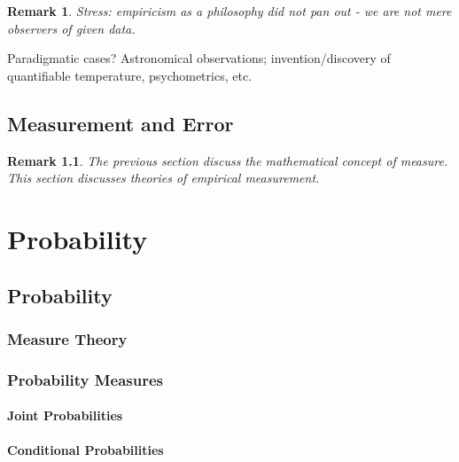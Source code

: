 \documentclass[reqno,12pt]{tufte-book}
\numberwithin{equation}{subsection}
\newtheorem{remark}{Remark}
\begin{document}
\begin{remark}
  Stress: empiricism as a philosophy did not pan out - we are not mere
  observers of given data.
\end{remark}

Paradigmatic cases?  Astronomical observations; invention/discovery of
quantifiable temperature, psychometrics, etc.

\chapter{Measurement and Error}

\begin{remark}
  The previous section discuss the mathematical concept of measure.
  This section discusses theories of empirical measure\textit{ment}.
\end{remark}

\part{Probability}

\chapter{Probability}

\section{Measure Theory}

\section{Probability Measures}

\subsection{Joint Probabilities}

\subsection{Conditional Probabilities}
\end{document}
